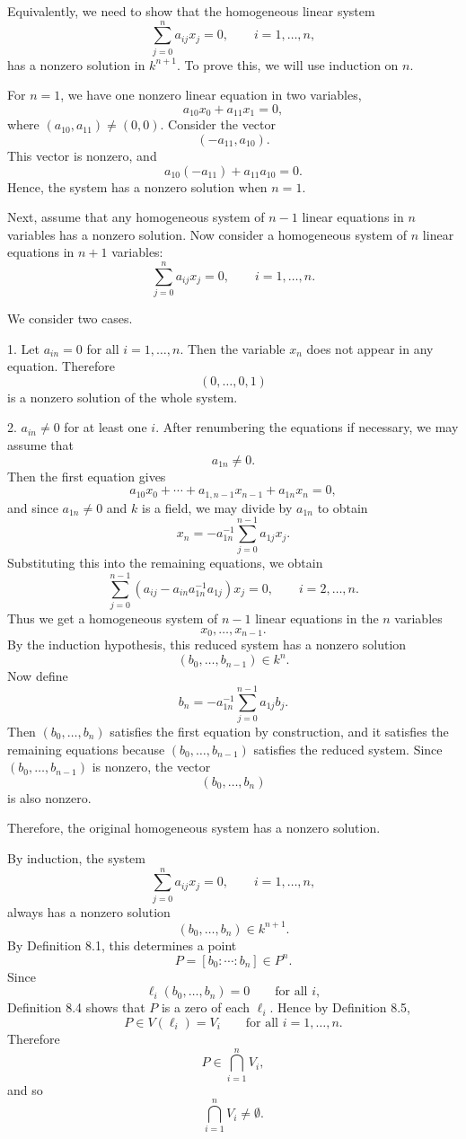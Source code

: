 \documentclass[a4paper,12pt]{article}
\theoremstyle{plain}
\theoremstyle{definition}
\theoremstyle{remark}
\begin{document}
Equivalently, we need to show that the homogeneous linear system
\[
\sum_{j=0}^n a_{ij}x_j=0,
\qquad i=1,\dots,n,
\]
has a nonzero solution in $k^{n+1}$. To prove this, we will use induction on $n$.
 
 
 For $n=1$, we have one nonzero linear equation in two variables,
\[
a_{10}x_0+a_{11}x_1=0,
\]
where $(a_{10},a_{11})\neq (0,0)$. Consider the vector
\[
(-a_{11},a_{10}).
\]
This vector is nonzero, and
\[
a_{10}(-a_{11})+a_{11}a_{10}=0.
\]
Hence, the system has a nonzero solution when $n=1$.

\medskip
Next, assume that any homogeneous system of $n-1$ linear equations in $n$ variables has a nonzero solution. Now consider a homogeneous system of $n$ linear equations in $n+1$ variables:
\[
\sum_{j=0}^n a_{ij}x_j=0,
\qquad i=1,\dots,n.
\]

We consider two cases.

1. Let $a_{in}=0$ for all $i=1,\dots,n$.
Then the variable $x_n$ does not appear in any equation. Therefore
\[
(0,\dots,0,1)
\]
is a nonzero solution of the whole system.

2. $a_{in}\neq 0$ for at least one $i$.
After renumbering the equations if necessary, we may assume that
\[
a_{1n}\neq 0.
\]
Then the first equation gives
\[
a_{10}x_0+\cdots+a_{1,n-1}x_{n-1}+a_{1n}x_n=0,
\]
and since $a_{1n}\neq 0$ and $k$ is a field, we may divide by $a_{1n}$ to obtain
\[
x_n=-a_{1n}^{-1}\sum_{j=0}^{n-1}a_{1j}x_j.
\]
Substituting this into the remaining equations, we obtain
\[
\sum_{j=0}^{n-1}\left(a_{ij}-a_{in}a_{1n}^{-1}a_{1j}\right)x_j=0,
\qquad i=2,\dots,n.
\]
Thus we get a homogeneous system of $n-1$ linear equations in the $n$ variables
\[
x_0,\dots,x_{n-1}.
\]
By the induction hypothesis, this reduced system has a nonzero solution
\[
(b_0,\dots,b_{n-1})\in k^n.
\]
Now define
\[
b_n=-a_{1n}^{-1}\sum_{j=0}^{n-1}a_{1j}b_j.
\]
Then $(b_0,\dots,b_n)$ satisfies the first equation by construction, and it satisfies the remaining equations because $(b_0,\dots,b_{n-1})$ satisfies the reduced system. Since $(b_0,\dots,b_{n-1})$ is nonzero, the vector
\[
(b_0,\dots,b_n)
\]
is also nonzero.

Therefore, the original homogeneous system has a nonzero solution.

\medskip

By induction, the system
\[
\sum_{j=0}^n a_{ij}x_j=0,
\qquad i=1,\dots,n,
\]
always has a nonzero solution
\[
(b_0,\dots,b_n)\in k^{n+1}.
\]
By Definition 8.1, this determines a point
\[
P=[b_0:\cdots:b_n]\in P^n.
\]
Since
\[
\ell_i(b_0,\dots,b_n)=0
\qquad\text{for all } i,
\]
Definition 8.4 shows that $P$ is a zero of each $\ell_i$. Hence by Definition 8.5,
\[
P\in V(\ell_i)=V_i
\qquad\text{for all } i=1,\dots,n.
\]
Therefore
\[
P\in \bigcap_{i=1}^n V_i,
\]
and so
\[
\bigcap_{i=1}^n V_i\neq \emptyset.
\]
\end{document}
